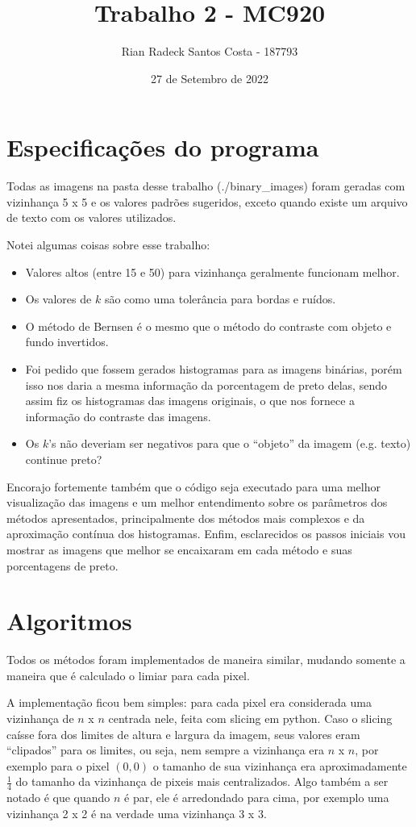 \documentclass[12pt, letterpaper]{article}
\title{Trabalho 2 - MC920}
\author{Rian Radeck Santos Costa - 187793}
\date{27 de Setembro de 2022}
\begin{document}
\maketitle
\newpage
\tableofcontents
\newpage

\section{Especificações do programa}
    Todas as imagens na pasta desse trabalho (./binary\_images) foram geradas com vizinhança 5 x 5 e os valores padrões sugeridos, exceto quando existe um arquivo de texto com os valores utilizados.
    
    Notei algumas coisas sobre esse trabalho:
    \begin{itemize}
        \item{Valores altos (entre 15 e 50) para vizinhança geralmente funcionam melhor.}
        \item{Os valores de $k$ são como uma tolerância para bordas e ruídos.}
        \item{O método de Bernsen é o mesmo que o método do contraste com objeto e fundo invertidos.}
        \item{Foi pedido que fossem gerados histogramas para as imagens binárias, porém isso nos daria a mesma informação da porcentagem de preto delas, sendo assim fiz os histogramas das imagens originais, o que nos fornece a informação do contraste das imagens.}
        \item{Os $k$'s não deveriam ser negativos para que o ``objeto'' da imagem (e.g. texto) continue preto?}
    \end{itemize}
    
    Encorajo fortemente também que o código seja executado para uma melhor visualização das imagens e um melhor entendimento sobre os parâmetros dos métodos apresentados, principalmente dos métodos mais complexos e da aproximação contínua dos histogramas.
    Enfim, esclarecidos os passos iniciais vou mostrar as imagens que melhor se encaixaram em cada método e suas porcentagens de preto. 

\section{Algoritmos}
    Todos os métodos foram implementados de maneira similar, mudando somente a maneira que é calculado o limiar para cada pixel.

    A implementação ficou bem simples: para cada pixel era considerada uma vizinhança de $n$ x $n$ centrada nele, feita com slicing em python. Caso o slicing caísse fora dos limites de altura e largura da imagem, seus valores eram ``clipados'' para os limites, ou seja, nem sempre a vizinhança era $n$ x $n$, por exemplo para o pixel $(0, 0)$ o tamanho de sua vizinhança era aproximadamente $\frac{1}{4}$ do tamanho da vizinhança de pixeis mais centralizados. Algo também a ser notado é que quando $n$ é par, ele é arredondado para cima, por exemplo uma vizinhança 2 x 2 é na verdade uma vizinhança 3 x 3.
\end{document}
